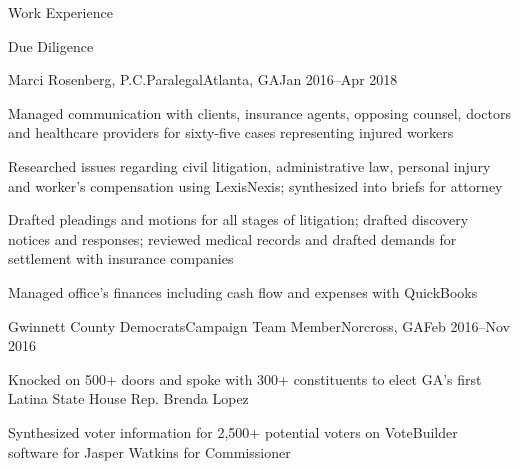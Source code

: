 \documentclass{resume_v3} %
\begin{document}
\begin{rSection}{Work Experience}
\begin{bulletGroup}{Due Diligence}
\end{bulletGroup}
\vspace{0.3em}
\begin{mainTitle}{Marci Rosenberg, P.C.}{Paralegal}{Atlanta, GA}{Jan 2016–Apr 2018}
\begin{bullets}
\item Managed communication with clients, insurance agents, opposing counsel, doctors and healthcare providers for sixty-five cases representing injured workers
\item Researched issues regarding civil litigation, administrative law, personal injury and worker's compensation using LexisNexis; synthesized into briefs for attorney
\item Drafted pleadings and motions for all stages of litigation; drafted discovery notices and responses; reviewed medical records and drafted demands for settlement with insurance companies
\item Managed office's finances including cash flow and expenses with QuickBooks
\end{bullets}
\end{mainTitle}
\vspace{0.3em}
\begin{mainTitle}{Gwinnett County Democrats}{Campaign Team Member}{Norcross, GA}{Feb 2016–Nov 2016}
\begin{bullets}
\item Knocked on 500+ doors and spoke with 300+ constituents to elect GA’s first Latina State House Rep. Brenda Lopez
\item Synthesized voter information for 2,500+ potential voters on VoteBuilder software for Jasper Watkins for Commissioner
\end{bullets}
\end{mainTitle}

\end{rSection}

\end{document}
